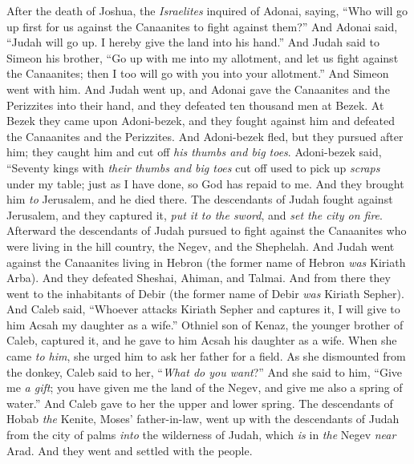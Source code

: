 
\begin{biblechapter} %
 After the death of Joshua, the \textit{Israelites} inquired of Adonai, saying, “Who will go up first for us against the Canaanites to fight against them?”
\verse And Adonai said, “Judah will go up. I hereby give the land into his hand.”
\verse And Judah said to Simeon his brother, “Go up with me into my allotment, and let us fight against the Canaanites; then I too will go with you into your allotment.” And Simeon went with him.
\verse And Judah went up, and Adonai gave the Canaanites and the Perizzites into their hand, and they defeated ten thousand men at Bezek.
\verse At Bezek they came upon Adoni-bezek, and they fought against him and defeated the Canaanites and the Perizzites.
\verse And Adoni-bezek fled, but they pursued after him; they caught him and cut off \textit{his thumbs and big toes}.
\verse Adoni-bezek said, “Seventy kings with \textit{their thumbs and big toes} cut off used to pick up \textit{scraps} under my table; just as I have done, so God has repaid to me. And they brought him \textit{to} Jerusalem, and he died there.
\verse The descendants of Judah fought against Jerusalem, and they captured it, \textit{put it to the sword}, and \textit{set the city on fire}.
\verse Afterward the descendants of Judah pursued to fight against the Canaanites who were living in the hill country, the Negev, and the Shephelah.
\verse And Judah went against the Canaanites living in Hebron (the former name of Hebron \textit{was} Kiriath Arba). And they defeated Sheshai, Ahiman, and Talmai.
\verse And from there they went to the inhabitants of Debir (the former name of Debir \textit{was} Kiriath Sepher).
\verse And Caleb said, “Whoever attacks Kiriath Sepher and captures it, I will give to him Acsah my daughter as a wife.”
\verse Othniel son of Kenaz, the younger brother of Caleb, captured it, and he gave to him Acsah his daughter as a wife.
\verse When she came \textit{to him}, she urged him to ask her father for a field. As she dismounted from the donkey, Caleb said to her, “\textit{What do you want}?”
\verse And she said to him, “Give me \textit{a gift}; you have given me the land of the Negev, and give me also a spring of water.” And Caleb gave to her the upper and lower spring.
\verse The descendants of Hobab \textit{the} Kenite, Moses’ father-in-law, went up with the descendants of Judah from the city of palms \textit{into} the wilderness of Judah, which \textit{is} in \textit{the} Negev \textit{near} Arad. And they went and settled with the people.

\end{biblechapter}
